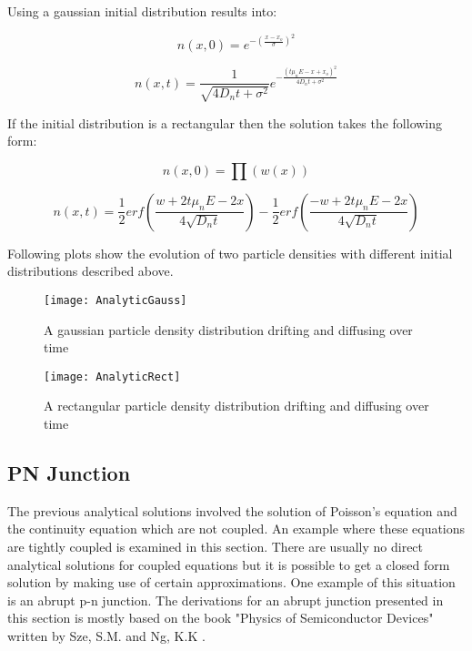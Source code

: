 \begin{doublespace}
Using a gaussian initial distribution results into:

\begin{equation}
n(x,0)=e^{- (\frac{x-x_o}{\sigma})^2}
\end{equation}

\begin{equation}
n(x,t)=\frac{1}{\sqrt{4D_nt+\sigma^{2}}}e^{-\frac{(t\mu_n E-x+x_o)^2}{4D_n t+\sigma^2}}
\end{equation}

If the initial distribution is a rectangular then the solution takes the following form:

\begin{equation}
n(x,0)=\prod (w(x))
\end{equation}

\begin{equation}
n(x,t)=\frac{1}{2} erf(\frac{w+2t \mu_n E-2x}{4\sqrt{D_n t}})-\frac{1}{2}erf(\frac{-w+2t \mu_n E-2x}{4\sqrt{D_n t}}) 
\end{equation}

Following plots show the evolution of two particle densities with different initial distributions described above.

\begin{figure}[!htp]
\centering
\texttt{[image: AnalyticGauss]}
\caption{A gaussian particle density distribution drifting and diffusing over time} 
\end{figure}

\begin{figure}[!htp]
\centering
\texttt{[image: AnalyticRect]}
\caption{A rectangular particle density distribution drifting and diffusing over time} 
\end{figure}
\clearpage
\subsection{PN Junction}
The previous analytical solutions involved the solution of Poisson's equation and the continuity equation which are not coupled. An example where these equations are tightly coupled is examined in this section. There are usually no direct analytical solutions for coupled equations but it is possible to get a closed form solution by making use of certain approximations. One example of this situation is an abrupt p-n junction. The derivations for an abrupt junction presented in this section is mostly based on the book "Physics of Semiconductor Devices" written by Sze, S.M. and Ng, K.K \cite{Physem}. 


\end{doublespace}
